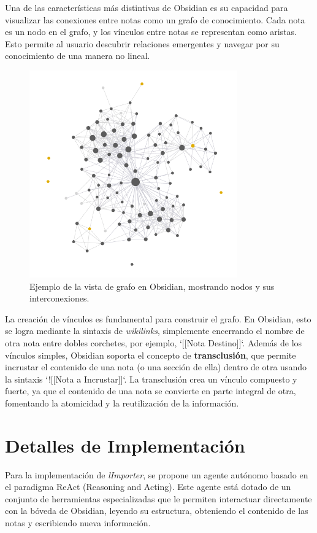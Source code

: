 Una de las características más distintivas de Obsidian es su capacidad para visualizar las conexiones entre notas como un grafo de conocimiento. Cada nota es un nodo en el grafo, y los vínculos entre notas se representan como aristas. Esto permite al usuario descubrir relaciones emergentes y navegar por su conocimiento de una manera no lineal.

\begin{figure}[h]
    \centering
    \includegraphics[width=0.8\textwidth]{figures/obsidian_kg_example.png}
    \caption{Ejemplo de la vista de grafo en Obsidian, mostrando nodos y sus interconexiones.}
    \label{fig:obsidian_graph}
\end{figure}

La creación de vínculos es fundamental para construir el grafo. En Obsidian, esto se logra mediante la sintaxis de \textit{wikilinks}, simplemente encerrando el nombre de otra nota entre dobles corchetes, por ejemplo, `[[Nota Destino]]`. Además de los vínculos simples, Obsidian soporta el concepto de \textbf{transclusión}, que permite incrustar el contenido de una nota (o una sección de ella) dentro de otra usando la sintaxis `![[Nota a Incrustar]]`. La transclusión crea un vínculo compuesto y fuerte, ya que el contenido de una nota se convierte en parte integral de otra, fomentando la atomicidad y la reutilización de la información.

\section{Detalles de Implementación}
Para la implementación de \textit{lImporter}, se propone un agente autónomo basado en el paradigma ReAct (Reasoning and Acting). Este agente está dotado de un conjunto de herramientas especializadas que le permiten interactuar directamente con la bóveda de Obsidian, leyendo su estructura, obteniendo el contenido de las notas y escribiendo nueva información.

